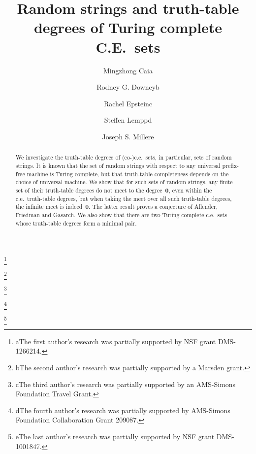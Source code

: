 \documentclass{LMCS}
\newcommand{\0}{\mathbf{0}}
\newcommand{\ce}{c.e.\ }
\newcommand{\<}{\langle}
\renewcommand{\>}{\rangle}
\begin{document}
\title[Random strings and tt-degrees of Turing complete C.E.\ sets]{Random strings and truth-table degrees of Turing complete C.E.\ sets}

\author[M.~Cai]{Mingzhong Cai\rsuper a}
\address{{\lsuper a}Department of Mathematics \\
  Dartmouth College \\
  Hanover, NH 03755, USA}
\thanks{{\lsuper a}The first author's research was partially supported
  by NSF grant DMS-1266214.}



\author[R.~G.~Downey]{Rodney G. Downey\rsuper b}
\address{{\lsuper b}Department of Mathematics, Statistics, and Operations
  Research \\
  Victoria University of Wellington \\
  P.O. Box 600 \\
  Wellington, NEW ZEALAND}
\thanks{{\lsuper b}The second author's research was partially supported by a
  Marsden grant.}



\author[R.~Epstein]{Rachel Epstein\rsuper c}
\address{{\lsuper c}Department of Mathematics and Statistics\\
  Swarthmore College \\
  500 College Ave \\
  Swarthmore, PA 19081, USA}
\thanks{{\lsuper c}The third author's research was partially supported by an
AMS-Simons Foundation Travel Grant.}



\author[S.~Lempp]{Steffen Lempp\rsuper d}
\address{{}Department of Mathematics \\
  University of Wisconsin \\
  Madison, WI 53706-1388, USA}

\thanks{{\lsuper d}The fourth author's research was partially
  supported by AMS-Simons Foundation Collaboration Grant 209087.}

\author[J.~S.~Miller]{Joseph S. Miller\rsuper e}
\thanks{{\lsuper e}The last author's research was partially supported
  by NSF grant DMS-1001847.}


\begin{abstract}
We investigate the truth-table degrees of (co-)c.e.\ sets, in particular,
sets of random strings. It is known that the set of random
strings with respect to any universal prefix-free machine is Turing complete,
but that truth-table completeness depends on the choice of universal machine.
We show that for such sets of
random strings, any finite set of their truth-table degrees do not meet to
the degree~$\mathbf0$, even within the \ce truth-table degrees, but when
taking the meet over all such truth-table degrees, the infinite meet is
indeed~$\mathbf0$. The latter result proves a conjecture of Allender,
Friedman and Gasarch. We also show that there are two Turing
complete c.e.\ sets whose truth-table degrees form a minimal pair.
\end{abstract}
\end{document}
